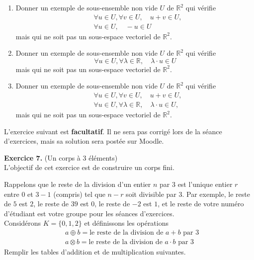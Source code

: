 \documentclass[a4paper, 10pt]{report}
\begin{document}
	\begin{enumerate}[label=\arabic*.]
		\item Donner un exemple de sous-ensemble non vide $U$ de
		$\mathbb{R}^2$ qui vérifie
		\[
		\begin{split}
			&\forall u \in U, \forall v \in U, \quad u + v \in U,\\
			&\forall u \in U, \quad -u \in U
		\end{split}
		\]
		mais qui ne soit pas un sous-espace vectoriel de $\mathbb{R}^2$.
		\item Donner un exemple de sous-ensemble non vide $U$ de
		$\mathbb{R}^2$ qui vérifie
		\[
			\forall u \in U, \forall \lambda \in \mathbb{R}, \quad
				\lambda \cdot u \in U
		\]
		mais qui ne soit pas un sous-espace vectoriel de $\mathbb{R}^2$.
		\item Donner un exemple de sous-ensemble non vide $U$ de
		$\mathbb{R}^2$ qui vérifie
		\[
		\begin{split}
			&\forall u \in U, \forall v \in U, \quad u + v \in U,\\
			&\forall u \in U, \forall \lambda \in \mathbb{R}, \quad
				\lambda \cdot u \in U,
		\end{split}
		\]
		mais qui ne soit pas un sous-espace vectoriel de $\mathbb{R}^2$.
	\end{enumerate}
		
	\newpage
	
	\noindent
	L'exercice suivant est \textbf{facultatif}. Il ne sera pas
	corrigé lors de la séance d'exercices, mais sa solution sera
	postée sur Moodle.
	
	\vspace{10mm}
	\noindent
	\textbf{Exercice 7.} (Un corps à 3 éléments)\\
	L’objectif de cet exercice est de construire un corps fini.
	
	\noindent
	Rappelons que le reste de la division d’un entier $n$ par $3$
	est l’unique entier $r$ entre $0$ et $3 - 1$ (compris) tel
	que $n - r$ soit divisible par $3$. Par exemple, le reste de
	$5$ est $2$, le reste de $39$ est $0$, le reste de $-2$ est $1$,
	et le reste de votre numéro d’étudiant est votre groupe pour
	les séances d’exercices.\\
	
	\noindent
	Considérons $K = \{0, 1, 2\}$ et définissons les opérations
	\[
	\begin{split}
		&a \oplus b = \text{le reste de la division de }
			a + b \text{ par } 3\\
		&a \otimes b = \text{le reste de la division de }
			a \cdot b \text{ par } 3
	\end{split}
	\]
	Remplir les tables d'addition et de multiplication suivantes.
	
\end{document}
